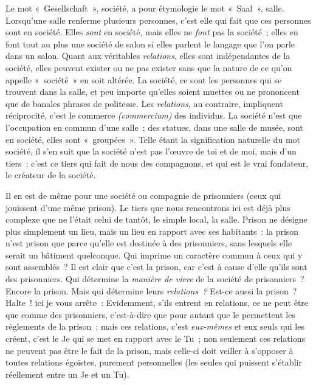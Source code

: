 \documentclass[french,twoside]{book} %
\begin{document}
\noindent Le mot « Gesellschaft », société, a pour étymologie le mot « Saal », salle. Lorsqu’une salle renferme plusieurs personnes, c’est elle qui fait que ces personnes sont en société. Elles \emph{sont} en société, mais elles ne \emph{font} pas la société ; elles en font tout au plus une société de salon si elles parlent le langage que l’on parle dans un salon. Quant aux véritables \emph{relations}, elles sont indépendantes de la société, elles peuvent exister ou ne pas exister sans que la nature de ce qu’on appelle « société » en soit altérée. La société, ce sont les personnes qui se trouvent dans la salle, et peu importe qu’elles soient muettes ou ne prononcent que de banales phrases de politesse. Les \emph{relations}, au contraire, impliquent réciprocité, c’est le commerce \emph{(commercium) }des individus. La société n’est que l’occupation en commun d’une salle ; des statues, dans une salle de musée, sont en société, elles sont « groupées ». Telle étant la signification naturelle du mot société, il s’en suit que la société n’est pas l’œuvre de toi et de moi, mais d’un tiers ; c’est ce tiers qui fait de nous des compagnons, et qui est le vrai fondateur, le créateur de la société.\par
Il en est de même pour une société ou compagnie de prisonniers (ceux qui jouissent d’une même prison). Le tiers que nous rencontrons ici est déjà plus complexe que ne l’était celui de tantôt, le simple local, la salle. Prison ne désigne plus simplement un lieu, mais un lieu en rapport avec ses habitants : la prison n’est prison que parce qu’elle est destinée à des prisonniers, sans lesquels elle serait un bâtiment quelconque. Qui imprime un caractère commun à ceux qui y sont assemblés ? Il est clair que c’est la prison, car c’est à cause d’elle qu’ils sont des prisonniers. Qui détermine la \emph{manière de vivre} de la société de prisonniers ?  Encore la prison. Mais qui détermine leurs \emph{relations ? }Est-ce aussi la prison ? Halte ! ici je vous arrête : Evidemment, s’ils entrent en relations, ce ne peut être que comme des prisonniers, c’est-à-dire que pour autant que le permettent les règlements de la prison ; mais ces relations, c’est \emph{eux-mêmes} et eux seuls qui les créent, c’est le Je qui se met en rapport avec le Tu ; non seulement ces relations ne peuvent pas être le fait de la prison, mais celle-ci doit veiller à s’opposer à toutes relations égoïstes, purement personnelles (les seules qui puissent s’établir réellement entre un Je et un Tu).\par
\end{document}
